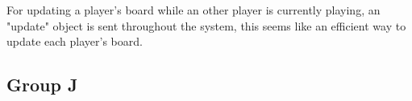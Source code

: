 \documentclass[10pt, a4paper]{article}
\begin{document}
	For updating a player's board while an other player is currently playing, an "update" object is sent throughout the system, this seems like an efficient way to update each player's board.
	

	

	
	
	\subsection{Group J}
	
	
\end{document}
